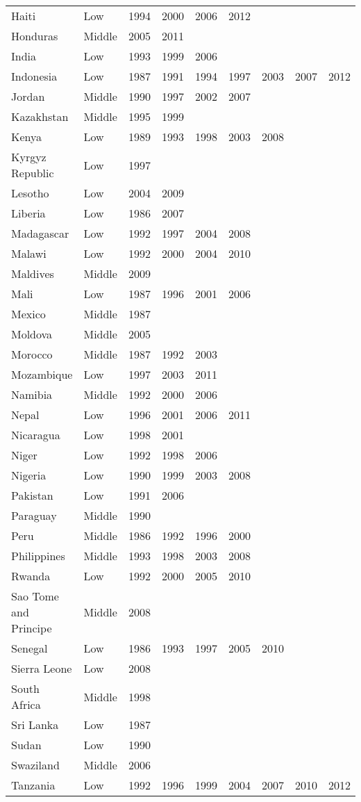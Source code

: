\begin{spacing}{1}
\begin{longtable}{llccccccc}
Haiti&Low&1994&2000&2006&2012&&&\\
Honduras&Middle&2005&2011&&&&&\\
India&Low&1993&1999&2006&&&&\\
Indonesia&Low&1987&1991&1994&1997&2003&2007&2012\\
Jordan&Middle&1990&1997&2002&2007&&&\\
Kazakhstan&Middle&1995&1999&&&&&\\
Kenya&Low&1989&1993&1998&2003&2008&&\\
Kyrgyz Republic&Low&1997&&&&&&\\
Lesotho&Low&2004&2009&&&&&\\
Liberia&Low&1986&2007&&&&&\\
Madagascar&Low&1992&1997&2004&2008&&&\\
Malawi&Low&1992&2000&2004&2010&&&\\
Maldives&Middle&2009&&&&&&\\
Mali&Low&1987&1996&2001&2006&&&\\
Mexico&Middle&1987&&&&&&\\
Moldova&Middle&2005&&&&&&\\
Morocco&Middle&1987&1992&2003&&&&\\
Mozambique&Low&1997&2003&2011&&&&\\
Namibia&Middle&1992&2000&2006&&&&\\
Nepal&Low&1996&2001&2006&2011&&&\\
Nicaragua&Low&1998&2001&&&&&\\
Niger&Low&1992&1998&2006&&&&\\
Nigeria&Low&1990&1999&2003&2008&&&\\
Pakistan&Low&1991&2006&&&&&\\
Paraguay&Middle&1990&&&&&&\\
Peru&Middle&1986&1992&1996&2000&&&\\
Philippines&Middle&1993&1998&2003&2008&&&\\
Rwanda&Low&1992&2000&2005&2010&&&\\
Sao Tome and Principe&Middle&2008&&&&&&\\
Senegal&Low&1986&1993&1997&2005&2010&&\\
Sierra Leone&Low&2008&&&&&&\\
South Africa&Middle&1998&&&&&&\\
Sri Lanka&Low&1987&&&&&&\\
Sudan&Low&1990&&&&&&\\
Swaziland&Middle&2006&&&&&&\\
Tanzania&Low&1992&1996&1999&2004&2007&2010&2012\\

\end{longtable}
\end{spacing}
